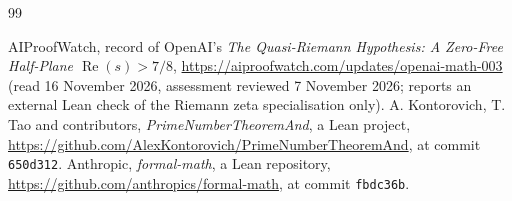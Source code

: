 \documentclass[11pt]{article}
\numberwithin{equation}{section}
\begin{document}
\begin{thebibliography}{99}
\raggedright

 AIProofWatch, record of OpenAI's \emph{The Quasi-Riemann Hypothesis: A Zero-Free Half-Plane
  $\operatorname{Re}(s) > 7/8$}, \url{https://aiproofwatch.com/updates/openai-math-003} (read 16 November 2026,
  assessment reviewed 7 November 2026; reports an external Lean check of the Riemann zeta specialisation only).
 A. Kontorovich, T. Tao and contributors, \emph{PrimeNumberTheoremAnd}, a Lean project,
  \url{https://github.com/AlexKontorovich/PrimeNumberTheoremAnd}, at commit \texttt{650d312}.
 Anthropic, \emph{formal-math}, a Lean repository, \url{https://github.com/anthropics/formal-math},
at commit \texttt{fbdc36b}.
\end{thebibliography}
\end{document}

